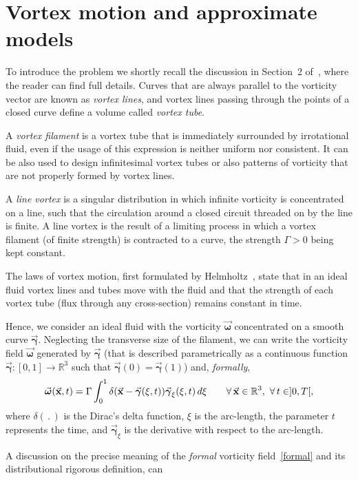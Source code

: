 \documentclass[a4paper,11pt]{article}
\numberwithin{equation}{section}
\newcommand{\R}{\mathbb{R}}
\newcommand{\bgamma}{\mbox{$\vec{\boldsymbol \gamma}$}}
\newcommand{\vomega}{\mbox{$\vec{\boldsymbol\omega}$}}
\newcommand{\x}{\mbox{$\vec{\bf x}$}}
\begin{document}
\section{Vortex motion and approximate models}
\label{section_formal}  
To introduce the problem we shortly recall the discussion in Section~2
of~\cite{bb}, where the reader can find full details. Curves that are
always parallel to the vorticity vector are known as \textit{vortex
  lines}, and vortex lines passing through the points of  a closed
curve define a volume called \textit{vortex tube}.\par 
%
A \textit{vortex filament} is a vortex tube that is immediately
surrounded by irrotational fluid, even if the usage of this expression
is neither uniform nor consistent. It can be also used to design
infinitesimal vortex tubes or also patterns of vorticity that are not
properly formed by vortex lines.\par
%
A \textit{line vortex} is a singular distribution in which infinite
vorticity is concentrated on a line, such that the circulation around
a closed circuit threaded on by the line is finite. A line vortex is
the result of a limiting process in which a vortex filament (of finite
strength) is contracted to a curve, the strength $\Gamma>0$ being kept
constant.\par 
%
The laws of vortex motion, first formulated by Helmholtz~\cite{helm},
state that in an ideal fluid vortex lines and tubes move with the
fluid and that the strength of each vortex tube (flux through any
cross-section) remains constant in time.\par  
%
Hence, we consider an ideal fluid with the vorticity $\vomega$
concentrated on a smooth curve $\bgamma$. Neglecting the transverse
size of the filament, we can write the vorticity field $\vomega$
generated by $\bgamma$ (that is described parametrically as a
continuous function $\bgamma :[0,1] \to \mathbb{R}^3$ such that
$\bgamma(0) = \bgamma(1)$) and, \textit{formally},
\begin{equation}\label{formal}
  \vomega(\x,t)=\Gamma\int_0^1\delta(\x-\bgamma(\xi,t))
  \bgamma_\xi(\xi,t)\,d\xi\qquad\forall\,\x\in\R^3,\
  \forall\,t\in]0,T[, 
\end{equation}
where $\delta(\,.\,)$ is the Dirac's delta function, $\xi$ is the
arc-length, the parameter $t$ represents the time, and $\bgamma_\xi$
is the derivative with respect to the arc-length.\par
A discussion on the precise meaning of the \textit{formal} vorticity
field~\eqref{formal} and its distributional rigorous definition, can
\end{document}
